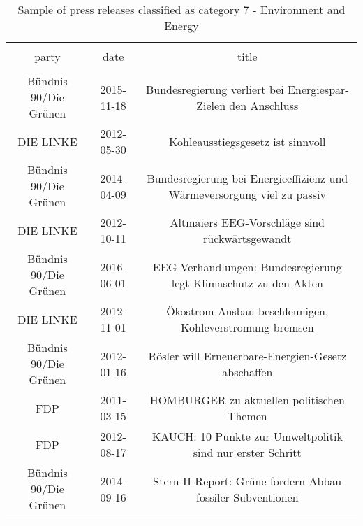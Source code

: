 
\begin{table}[!htbp] \centering 
  \caption{Sample of press releases classified as category 7 - Environment and Energy} 
  \label{tab:7-document-samples} 
\begin{tabular}{@{\extracolsep{5pt}} ccc} 
\\[-1.8ex]\hline 
\hline \\[-1.8ex] 
party & date & title \\ 
\hline \\[-1.8ex] 
Bündnis 90/Die Grünen & 2015-11-18 & Bundesregierung verliert bei Energiespar-Zielen den Anschluss \\ 
DIE LINKE & 2012-05-30 & Kohleausstiegsgesetz ist sinnvoll \\ 
Bündnis 90/Die Grünen & 2014-04-09 & Bundesregierung bei Energieeffizienz und Wärmeversorgung viel zu passiv \\ 
DIE LINKE & 2012-10-11 & Altmaiers EEG-Vorschläge sind rückwärtsgewandt \\ 
Bündnis 90/Die Grünen & 2016-06-01 & EEG-Verhandlungen: Bundesregierung legt Klimaschutz zu den Akten \\ 
DIE LINKE & 2012-11-01 & Ökostrom-Ausbau beschleunigen, Kohleverstromung bremsen \\ 
Bündnis 90/Die Grünen & 2012-01-16 & Rösler will Erneuerbare-Energien-Gesetz abschaffen \\ 
FDP & 2011-03-15 & HOMBURGER zu aktuellen politischen Themen \\ 
FDP & 2012-08-17 & KAUCH: 10 Punkte zur Umweltpolitik sind nur erster Schritt \\ 
Bündnis 90/Die Grünen & 2014-09-16 & Stern-II-Report: Grüne fordern Abbau fossiler Subventionen \\ 
\hline \\[-1.8ex] 
\end{tabular} 
\end{table} 

